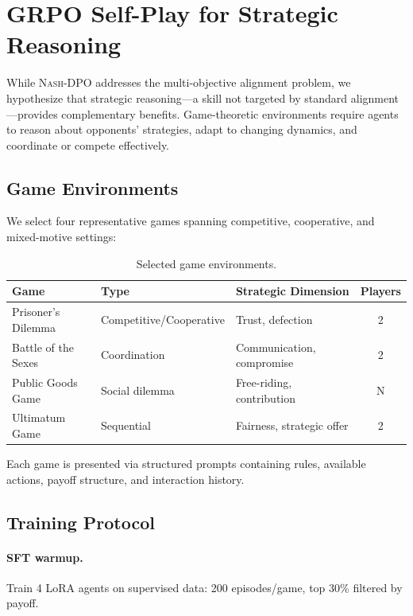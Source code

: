 \documentclass{article}
\newcommand{\NashDPO}{\textsc{Nash-DPO}}
\begin{document}
\section{GRPO Self-Play for Strategic Reasoning}
\label{sec:grpo}

While \NashDPO{} addresses the multi-objective alignment problem, we hypothesize that strategic reasoning---a skill not targeted by standard alignment---provides complementary benefits.
Game-theoretic environments require agents to reason about opponents' strategies, adapt to changing dynamics, and coordinate or compete effectively.

\subsection{Game Environments}

We select four representative games spanning competitive, cooperative, and mixed-motive settings:

\begin{table}[h]
\centering
\small
\begin{tabular}{lllc}
\toprule
Game & Type & Strategic Dimension & Players \\
\midrule
Prisoner's Dilemma & Competitive/Cooperative & Trust, defection & 2 \\
Battle of the Sexes & Coordination & Communication, compromise & 2 \\
Public Goods Game & Social dilemma & Free-riding, contribution & N \\
Ultimatum Game & Sequential & Fairness, strategic offer & 2 \\
\bottomrule
\end{tabular}
\caption{Selected game environments.}
\label{tab:games}
\end{table}

Each game is presented via structured prompts containing rules, available actions, payoff structure, and interaction history.

\subsection{Training Protocol}

\paragraph{SFT warmup.}
Train 4 LoRA agents on supervised data: 200 episodes/game, top 30\% filtered by payoff.
\end{document}
